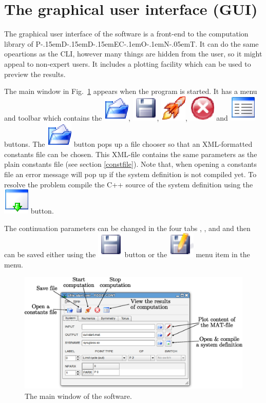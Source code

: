 \documentclass[10pt,a4paper]{ddedoc}
\def\pdde{{P\kern-.15emD\kern-.15emD\kern-.15emE\raisebox{.25ex}{-}C\kern-.1emO\kern-.1emN\kern-.05emT}}
\def\iconRun{\includegraphics[scale=0.5]{fig/cr22-action-launch.eps}}
\def\iconStop{\includegraphics[scale=0.5]{fig/cr22-action-stop.eps}}
\def\iconBuild{\includegraphics[scale=0.5]{fig/cr22-action-build.eps}}
\def\iconSaveAs{\includegraphics[scale=0.5]{fig/cr22-action-filesaveas.eps}}
\def\iconText{\includegraphics[scale=0.5]{fig/cr22-action-view_text.eps}}
\def\iconOpen{\includegraphics[scale=0.5]{fig/cr22-action-fileopen.eps}}
\def\iconSave{\includegraphics[scale=0.5]{fig/cr22-action-filesave.eps}}
\begin{document}
\section{The graphical user interface (GUI)}

The graphical user interface of the software is a front-end to the computation
library of \pdde{}. It can do the same opeartions as the CLI, however many things are
hidden from the user, so it might appeal to non-expert users. It includes a plotting
facility which can be used to preview the results.

The main window in Fig.\ \ref{mainwindow} appears
when the program  is started.
It has a menu and toolbar which 
contains the  \iconOpen{},  \iconSave{},
 \iconRun{},  \iconStop{} and
 \iconText{} buttons. The  \iconOpen{} button pops up a
file chooser so that an XML-formatted constants file can be chosen. This
XML-file contains the same parameters as the plain constants file (see section
\ref{constfile}). Note that, when opening a constants file an error message will pop up if
the system definition is not compiled yet. To resolve the problem compile the C++ source
of the system definition using the  \iconBuild{} button.

The continuation parameters can be changed in the four tabs ,
,  and  and then can be saved
either using the  \iconSave{} button or the 
\iconSaveAs{} menu item in the  menu.
\begin{figure}[bth!]
\begin{center}
\includegraphics[scale=0.5]{fig/mainwindow.eps}
\caption{The main window of the software.}
\label{mainwindow}
\end{center}
\end{figure}
\end{document}

